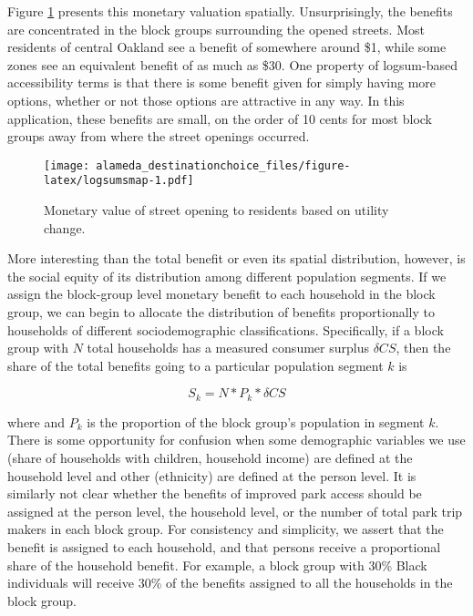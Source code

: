 \documentclass[]{elsarticle} %
\makeatletter
\def\maxwidth{\ifdim\Gin@nat@width>\linewidth\linewidth
\else\Gin@nat@width\fi}
\let\Oldincludegraphics\includegraphics
\renewcommand{\includegraphics}[1]{\Oldincludegraphics[width=\maxwidth]{#1}}
\makeatother
\begin{document}
Figure \ref{fig:logsumsmap} presents this monetary valuation spatially.
Unsurprisingly, the benefits are concentrated in the block groups surrounding
the opened streets. Most residents of central Oakland see a benefit of somewhere
around \$1, while some zones see an equivalent benefit of as much as \$30. One
property of logsum-based accessibility terms is that there is some benefit given
for simply having more options, whether or not those options are attractive in
any way. In this application, these benefits are small, on the order of 10 cents
for most block groups away from where the street openings occurred.

\begin{figure}
\centering
\texttt{[image: alameda\_destinationchoice\_files/figure-latex/logsumsmap-1.pdf]}
\caption{\label{fig:logsumsmap}Monetary value of street opening to residents based on utility change.}
\end{figure}

More interesting than the total benefit or even its spatial distribution, however,
is the social equity of its distribution among different population segments.
If we assign the block-group level monetary benefit to each household in the block
group, we can begin to allocate the distribution of benefits proportionally to
households of different sociodemographic classifications. Specifically, if a block
group with \(N\) total households has a measured consumer surplus \(\delta CS\), then the
share of the total benefits going to a particular population segment \(k\) is

\begin{equation}
  S_k = N * P_k * \delta CS
  \label{eq:cs-alloc}
\end{equation}

where and \(P_k\) is the proportion of the block group's population in segment \(k\).
There is some opportunity for confusion when some demographic variables we use
(share of households with children, household income) are defined at the
household level and other (ethnicity) are defined at the person level. It is similarly
not clear whether the benefits of improved park access should be assigned at
the person level, the household level, or the number of total park trip makers in
each block group. For consistency and simplicity, we assert that the benefit is
assigned to each household, and that persons receive a proportional share of the
household benefit. For example, a block group with 30\% Black individuals will
receive 30\% of the benefits assigned to all the households in the block group.
\end{document}
